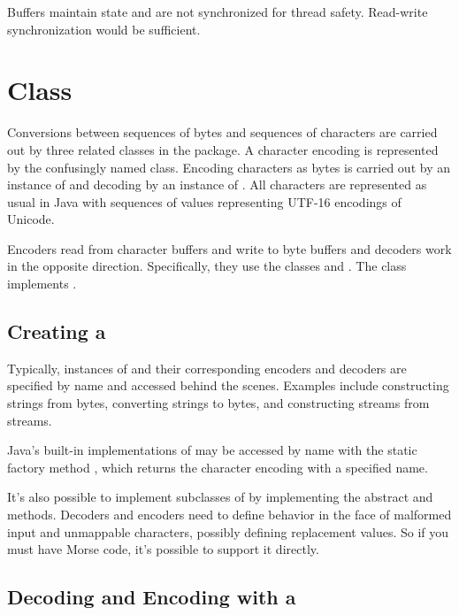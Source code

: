 Buffers maintain state and are not synchronized for thread safety.
Read-write synchronization would be sufficient.



\section{ Class}

Conversions between sequences of bytes and sequences of characters are
carried out by three related classes in the 
package.  A character encoding is represented by the confusingly named
 class.  Encoding characters as bytes is carried out by
an instance of  and decoding by an instance of
.  All characters are represented as usual in
Java with sequences of  values representing UTF-16
encodings of Unicode.

Encoders read from character buffers and write to byte buffers and
decoders work in the opposite direction.  Specifically, they use the
 classes  and .  The
class  implements .

\subsection{Creating a }

Typically, instances of  and their corresponding
encoders and decoders are specified by name and accessed behind the
scenes.  Examples include constructing strings from bytes, converting
strings to bytes, and constructing  streams from
 streams.

Java's built-in implementations of  may be accessed by
name with the static factory method ,
which returns the character encoding with a specified name.  

It's also possible to implement subclasses of  by
implementing the abstract  and 
methods.  Decoders and encoders need to define behavior in the face of
malformed input and unmappable characters, possibly defining
replacement values. So if you must have Morse code, it's possible to
support it directly.  

\subsection{Decoding and Encoding with a }


